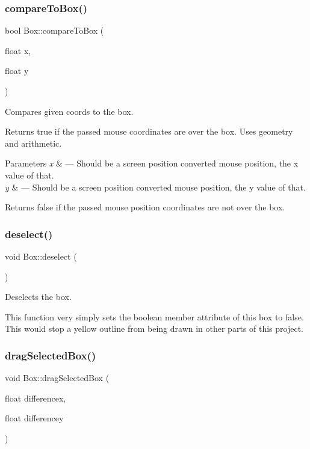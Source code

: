 \subsubsection{\texorpdfstring{compare\+To\+Box()}{compareToBox()}}
{\footnotesize\ttfamily bool Box\+::compare\+To\+Box (\begin{DoxyParamCaption}\item[{float}]{x,  }\item[{float}]{y }\end{DoxyParamCaption})}



Compares given coords to the box. 

Returns true if the passed mouse coordinates are over the box. Uses geometry and arithmetic.


\begin{DoxyParams}{Parameters}
{\em x} & --- Should be a screen position converted mouse position, the x value of that. \\
\hline
{\em y} & --- Should be a screen position converted mouse position, the y value of that.\\
\hline
\end{DoxyParams}
Returns false if the passed mouse position coordinates are not over the box. \mbox{\label{class_box_ad3ac0f85b1b947ab35ca9b1da92ba8e6}} 
\subsubsection{\texorpdfstring{deselect()}{deselect()}}
{\footnotesize\ttfamily void Box\+::deselect (\begin{DoxyParamCaption}{ }\end{DoxyParamCaption})}



Deselects the box. 

This function very simply sets the boolean member attribute of this box to false. This would stop a yellow outline from being drawn in other parts of this project. \mbox{\label{class_box_a2c0e2d7f2862ccf900cef89db6e51679}} 
\subsubsection{\texorpdfstring{drag\+Selected\+Box()}{dragSelectedBox()}}
{\footnotesize\ttfamily void Box\+::drag\+Selected\+Box (\begin{DoxyParamCaption}\item[{float}]{differencex,  }\item[{float}]{differencey }\end{DoxyParamCaption})}



